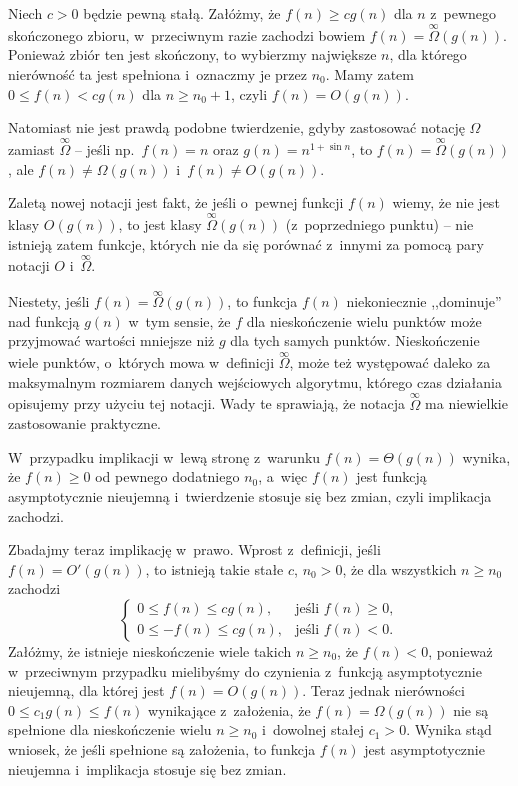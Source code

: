 
\subproblem %
Niech $c>0$ będzie pewną stałą.
Załóżmy, że $f(n)\ge cg(n)$ dla $n$ z~pewnego skończonego zbioru, w~przeciwnym razie zachodzi bowiem $f(n)=\overset{\infty}{\Omega}(g(n))$.
Ponieważ zbiór ten jest skończony, to wybierzmy największe $n$, dla którego nierówność ta jest spełniona i~oznaczmy je przez $n_0$.
Mamy zatem $0\le f(n)<cg(n)$ dla $n\ge n_0+1$, czyli $f(n)=O(g(n))$.

Natomiast nie jest prawdą podobne twierdzenie, gdyby zastosować notację $\Omega$ zamiast $\overset{\infty}{\Omega}$ -- jeśli np.\ $f(n)=n$ oraz $g(n)=n^{1+\sin n}$, to $f(n)=\overset{\infty}{\Omega}(g(n))$, ale $f(n)\ne\Omega(g(n))$ i~$f(n)\ne O(g(n))$.

\subproblem %
Zaletą nowej notacji jest fakt, że jeśli o~pewnej funkcji $f(n)$ wiemy, że nie jest klasy $O(g(n))$, to jest klasy $\overset{\infty}{\Omega}(g(n))$ (z~poprzedniego punktu) -- nie istnieją zatem funkcje, których nie da się porównać z~innymi za pomocą pary notacji $O$ i~$\overset{\infty}{\Omega}$.

Niestety, jeśli $f(n)=\overset{\infty}{\Omega}(g(n))$, to funkcja $f(n)$ niekoniecznie ,,dominuje'' nad funkcją $g(n)$ w~tym sensie, że $f$ dla nieskończenie wielu punktów może przyjmować wartości mniejsze niż $g$ dla tych samych punktów.
Nieskończenie wiele punktów, o~których mowa w~definicji $\overset{\infty}{\Omega}$, może też występować daleko za maksymalnym rozmiarem danych wejściowych algorytmu, którego czas działania opisujemy przy użyciu tej notacji.
Wady te sprawiają, że notacja $\overset{\infty}{\Omega}$ ma niewielkie zastosowanie praktyczne.

\subproblem %
W~przypadku implikacji w~lewą stronę z~warunku $f(n)=\Theta(g(n))$ wynika, że $f(n)\ge0$ od pewnego dodatniego $n_0$, a~więc $f(n)$ jest funkcją asymptotycznie nieujemną i~twierdzenie stosuje się bez zmian, czyli implikacja zachodzi.

Zbadajmy teraz implikację w~prawo.
Wprost z~definicji, jeśli $f(n)=O'(g(n))$, to istnieją takie stałe $c$, $n_0>0$, że dla wszystkich $n\ge n_0$ zachodzi
\[
	\begin{cases}
		0 \le f(n) \le cg(n), & \text{jeśli $f(n)\ge0$}, \\
		0 \le -f(n) \le cg(n), & \text{jeśli $f(n)<0$}.
	\end{cases}
\]
Załóżmy, że istnieje nieskończenie wiele takich $n\ge n_0$, że $f(n)<0$, ponieważ w~przeciwnym przypadku mielibyśmy do czynienia z~funkcją asymptotycznie nieujemną, dla której jest $f(n)=O(g(n))$.
Teraz jednak nierówności $0\le c_1g(n)\le f(n)$ wynikające z~założenia, że $f(n)=\Omega(g(n))$ nie są spełnione dla nieskończenie wielu $n\ge n_0$ i~dowolnej stałej $c_1>0$.
Wynika stąd wniosek, że jeśli spełnione są założenia, to funkcja $f(n)$ jest asymptotycznie nieujemna i~implikacja stosuje się bez zmian.

